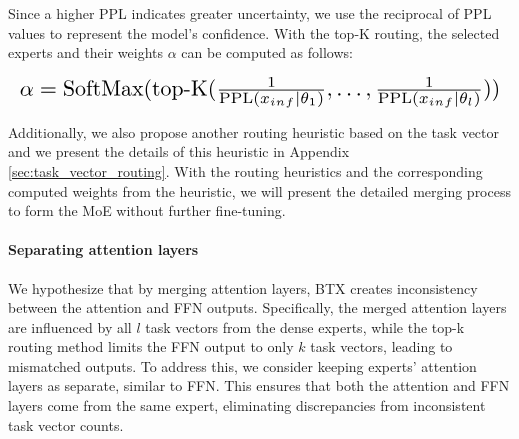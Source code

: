 Since a higher PPL indicates greater uncertainty, we use the reciprocal of PPL values to represent the model's confidence. With the top-K routing, the selected experts and their weights $\alpha$ can be computed as follows:

\begin{equation*}
    \resizebox{\columnwidth}{!}{%
        $\alpha = \text{SoftMax}(\text{top-K}(\frac{1}{\text{PPL}(x_{inf} \mid \theta_1)}, \dots, \frac{1}{\text{PPL}(x_{inf} \mid \theta_l)}))$%
        }
\end{equation*}

Additionally, we also propose another routing heuristic based on the task vector and we present the details of this heuristic in Appendix \ref{sec:task_vector_routing}. With the routing heuristics and the corresponding computed weights from the heuristic, we will present the detailed merging process to form the MoE without further fine-tuning.

\paragraph{Separating attention layers}


We hypothesize that by merging attention layers, BTX creates inconsistency between the attention and FFN outputs. Specifically, the merged attention layers are influenced by all $l$ task vectors from the dense experts, while the top-k routing method limits the FFN output to only $k$ task vectors, leading to mismatched outputs.
To address this, we consider keeping experts' attention layers as separate, similar to FFN. This ensures that both the attention and FFN layers come from the same expert, eliminating discrepancies from inconsistent task vector counts.


